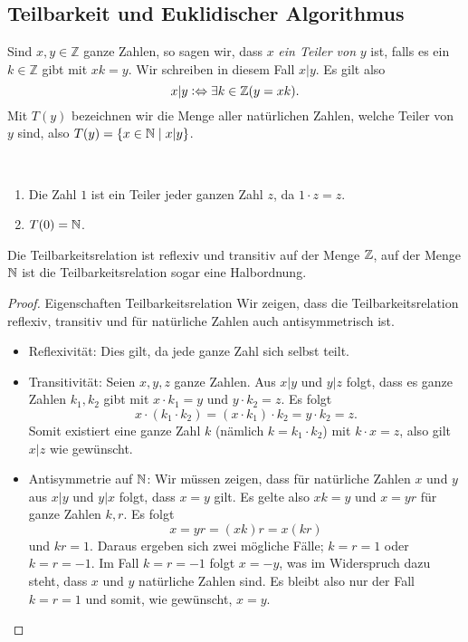 \subsection{Teilbarkeit und Euklidischer Algorithmus}
\begin{definition}
 Sind $x,y\in\mathbb{Z}$ ganze Zahlen, so sagen wir, dass $x$ \textit{ein Teiler von} $y$ ist, falls es ein $k\in\mathbb{Z}$ gibt mit $xk=y$. Wir schreiben in diesem Fall $x|y$. Es gilt also
\[
 x|y:\Leftrightarrow \exists k\in\mathbb{Z}(y=xk).
\]
Mit $T(y)$ bezeichnen wir die Menge aller natürlichen Zahlen, welche Teiler von $y$ sind, also $T(y)=\{x\in\mathbb{N}\mid x|y\}$.
\end{definition}
\begin{example}~
 \begin{enumerate}
  \item Die Zahl $1$ ist ein Teiler jeder ganzen Zahl $z$, da $1\cdot z=z$.
\item $T(0)=\mathbb{N}$.
 \end{enumerate}

\end{example}
\begin{remark}
 Die Teilbarkeitsrelation ist reflexiv und transitiv auf der Menge $\mathbb{Z}$, auf der Menge $\mathbb{N}$ ist die Teilbarkeitsrelation sogar eine Halbordnung.
\end{remark}
\begin{proof}{Eigenschaften Teilbarkeitsrelation}
Wir zeigen, dass die Teilbarkeitsrelation reflexiv, transitiv und für natürliche Zahlen auch antisymmetrisch ist.
\begin{itemize}
\item Reflexivität: Dies gilt, da jede ganze Zahl sich selbst teilt.
\item Transitivität: Seien $x,y,z$ ganze Zahlen. Aus $x|y$ und $y|z$ folgt, dass es ganze Zahlen $k_1,k_2$ gibt mit $x\cdot k_1=y$ und $y\cdot k_2=z$. Es folgt
\[
x\cdot(k_1\cdot k_2)=(x\cdot k_1)\cdot k_2=y\cdot k_2=z.
\]
 Somit existiert eine ganze Zahl $k$ (nämlich $k=k_1\cdot k_2$) mit $k\cdot x=z$, also gilt $x|z$ wie gewünscht.\qedhere
\item Antisymmetrie auf $\mathbb{N}$: Wir müssen zeigen, dass für natürliche Zahlen $x$ und $y$ aus $x|y$ und $y|x$ folgt, dass $x=y$ gilt. Es gelte also $xk=y$ und $x=yr$ für ganze Zahlen $k,r$. Es folgt
\[
x=yr=(xk)r=x(kr)
\]
und $kr=1$. Daraus ergeben sich zwei mögliche Fälle; $k=r=1$ oder $k=r=-1$. Im Fall $k=r=-1$ folgt $x=-y$, was im Widerspruch dazu steht, dass $x$ und $y$ natürliche Zahlen sind. Es bleibt also nur der Fall $k=r=1$ und somit, wie gewünscht, $x=y$.
\end{itemize}
\end{proof}


